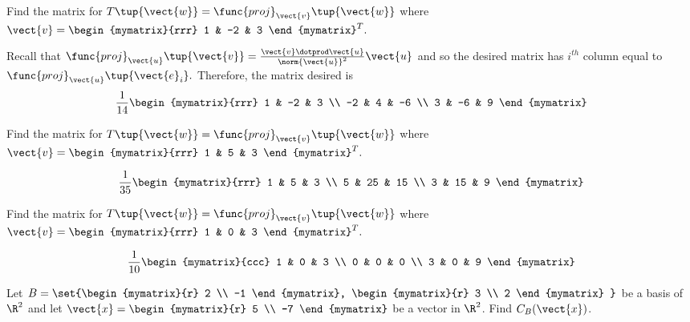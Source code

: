 \begin{enumialphparenastyle}
\begin{ex}  Find the matrix for $T\tup{\vect{w} } = \func{proj}_{\vect{v}}\tup{\vect{w}} $
where $\vect{v}=\begin{mymatrix}{rrr}
1 & -2 & 3
\end{mymatrix} ^{T}.$
\begin{sol}
 Recall that $\func{proj}_{\vect{u}}\tup{\vect{v}} =\frac{\vect{v}\dotprod\vect{u} }{\norm{\vect{u}} ^{2}}\vect{u}$ and so the desired matrix
has $i^{th}$ column equal to $\func{proj}_{\vect{u}}\tup{\vect{e}_{i}} .$ Therefore, the matrix desired is
\[
\frac{1}{14}\begin{mymatrix}{rrr}
1 & -2 & 3 \\
-2 & 4 & -6 \\
3 & -6 & 9
\end{mymatrix}
\]
\end{sol}
\end{ex}

\begin{ex}  Find the matrix for $T\tup{\vect{w} } = \func{proj}_{\vect{v}}\tup{\vect{w}} $
where $\vect{v}=\begin{mymatrix}{rrr}
1 & 5 & 3
\end{mymatrix} ^{T}.$
\begin{sol}
\[
\frac{1}{35}\begin{mymatrix}{rrr}
1 & 5 & 3 \\
5 & 25 & 15 \\
3 & 15 & 9
\end{mymatrix}
\]
\end{sol}
\end{ex}

\begin{ex} Find the matrix for $T\tup{\vect{w} } = \func{proj}_{\vect{v}}\tup{\vect{w}} $
where $\vect{v}=\begin{mymatrix}{rrr}
1 & 0 & 3
\end{mymatrix} ^{T}.$ 
\begin{sol}
\[
\frac{1}{10}\begin{mymatrix}{ccc}
1 & 0 & 3 \\
0 & 0 & 0 \\
3 & 0 & 9
\end{mymatrix}
\]
\end{sol}
\end{ex}





\begin{ex}
Let $B = \set{\begin{mymatrix}{r}
2 \\
-1 
\end{mymatrix}, \begin{mymatrix}{r}
3 \\
2
\end{mymatrix} }$ be a basis of $\R^2$ and let $\vect{x} = \begin{mymatrix}{r}
5 \\
-7
\end{mymatrix}$ be a vector in $\R^2$. Find $C_B(\vect{x})$. 
\end{ex}


\end{enumialphparenastyle}
